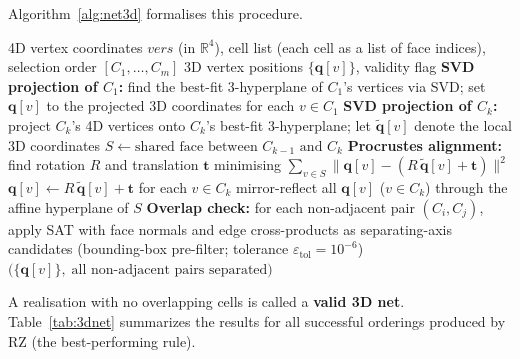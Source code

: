 \documentclass[12pt]{article}
\theoremstyle{definition}
\begin{document}
Algorithm~\ref{alg:net3d} formalises this procedure.

\begin{algorithm}[htbp]
\caption{3D Net Construction (4D polytopes)}
\label{alg:net3d}
\begin{algorithmic}[1]
\Require 4D vertex coordinates $\mathit{vers}$ (in $\mathbb{R}^4$),
         cell list (each cell as a list of face indices),
         selection order $[C_1,\ldots,C_m]$
\Ensure 3D vertex positions $\{\mathbf{q}[v]\}$, validity flag
\State \textbf{SVD projection of $C_1$:}
       find the best-fit 3-hyperplane of $C_1$'s vertices via SVD;
       set $\mathbf{q}[v]$ to the projected 3D coordinates for each
       $v\in C_1$
  \State \textbf{SVD projection of $C_k$:}
         project $C_k$'s 4D vertices onto $C_k$'s best-fit 3-hyperplane;
         let $\tilde{\mathbf{q}}[v]$ denote the local 3D coordinates
  \State $S \gets \text{shared face between } C_{k-1} \text{ and } C_k$
         \hfill{}
  \State \textbf{Procrustes alignment:}
         find rotation $R$ and translation $\mathbf{t}$ minimising
         $\displaystyle\sum_{v\in S}
           \bigl\|\mathbf{q}[v]-(R\,\tilde{\mathbf{q}}[v]+\mathbf{t})\bigr\|^2$
  \State $\mathbf{q}[v] \gets R\,\tilde{\mathbf{q}}[v]+\mathbf{t}$
         for each $v\in C_k$
    \State mirror-reflect all $\mathbf{q}[v]$ ($v\in C_k$) through the
           affine hyperplane of $S$
           \hfill{}
  \EndIf
\EndFor
\State \textbf{Overlap check:}
       for each non-adjacent pair $(C_i,C_j)$, apply SAT with face
       normals and edge cross-products as separating-axis candidates
       (bounding-box pre-filter; tolerance $\varepsilon_{\mathrm{tol}}=10^{-6}$)
\State \Return $\bigl(\{\mathbf{q}[v]\},\;\text{all non-adjacent pairs separated}\bigr)$
\end{algorithmic}
\end{algorithm}

A realisation with no overlapping cells is called a
\textbf{valid 3D net}.
Table~\ref{tab:3dnet} summarizes the results for all successful
orderings produced by RZ (the best-performing rule).
\end{document}
